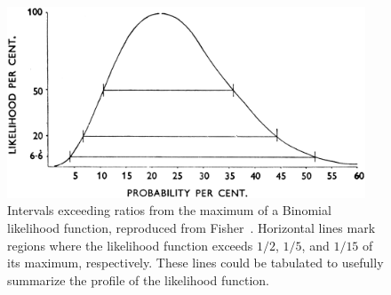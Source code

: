 \begin{figure}[tp]
\centering
\includegraphics[width=0.95\textwidth]{figures/searches_fisher_likelihood_binomial.png}
\caption[
Intervals exceeding ratios from the maximum of a Binomial likelihood function,
reproduced from Fisher
]{%
Intervals exceeding ratios from the maximum of a Binomial likelihood function,
reproduced from Fisher~\cite{fisher1956statistical}.
Horizontal lines mark regions where the likelihood function exceeds
$1/2$, $1/5$, and $1/15$ of its maximum, respectively.
These lines could be tabulated to usefully summarize the profile of the
likelihood function.
}
\label{fig:searches_fisher_likelihood}
\end{figure}

